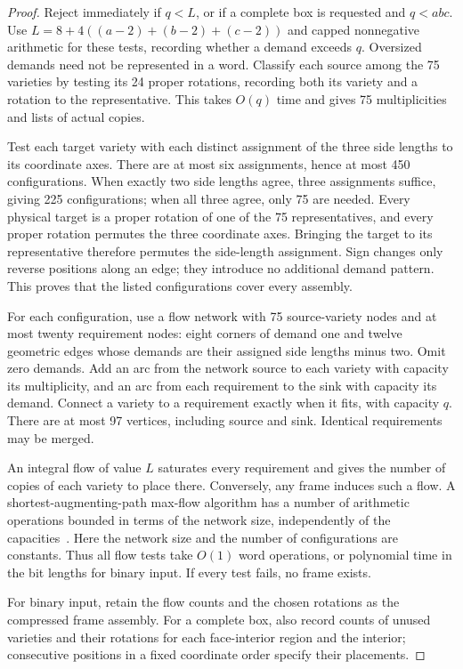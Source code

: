 \begin{proof}
Reject immediately if $q<L$, or if a complete box is requested and $q<abc$.
Use $L=8+4((a-2)+(b-2)+(c-2))$ and capped nonnegative arithmetic
for these tests, recording whether a demand exceeds $q$. Oversized demands
need not be represented in a word.
Classify each source among the 75 varieties by testing its 24 proper
rotations, recording both its variety and a rotation to the representative.
This takes $O(q)$ time and gives 75 multiplicities and lists of actual copies.

Test each target variety with each distinct assignment of the three side
lengths to its coordinate axes. There are at most six assignments, hence
at most 450 configurations. When exactly two side lengths agree, three
assignments suffice, giving 225 configurations; when all three agree,
only 75 are needed. Every physical target is a proper rotation of one
of the 75 representatives, and every proper rotation permutes the three
coordinate axes. Bringing the target to its representative therefore
permutes the side-length assignment. Sign changes only reverse positions
along an edge; they introduce no additional demand pattern. This proves
that the listed configurations cover every assembly.

For each configuration, use a flow network with 75 source-variety nodes
and at most twenty requirement nodes: eight corners of demand one and
twelve geometric edges whose demands are their assigned side lengths
minus two. Omit zero demands. Add an arc from the network source to each
variety with capacity its multiplicity, and an arc from each requirement
to the sink with capacity its demand. Connect a variety to a requirement
exactly when it fits, with capacity $q$. There are at most 97 vertices,
including source and sink. Identical requirements may be merged.

An integral flow of value $L$ saturates every requirement and gives the
number of copies of each variety to place there. Conversely, any frame
induces such a flow. A shortest-augmenting-path max-flow algorithm has a
number of arithmetic operations bounded in terms of the network size,
independently of the capacities~\cite{EdmondsKarp}. Here the network size
and the number of configurations are constants. Thus all flow tests take
$O(1)$ word operations, or polynomial time in the bit lengths for binary
input. If every test fails, no frame exists.

For binary input, retain the flow counts and the chosen rotations as the
compressed frame assembly. For a complete box, also record counts of unused
varieties and their rotations for each face-interior region and the interior;
consecutive positions in a fixed coordinate order specify their placements.


\end{proof}
